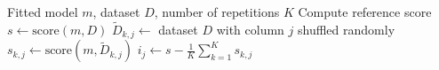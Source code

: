 \begin{algorithmic}
\Require Fitted model $m$, dataset $D$, number of repetitions $K$
\State Compute reference score $s \gets \text{score}(m, D)$
        \State $\tilde{D}_{k,j} \gets$ dataset $D$ with column $j$ shuffled randomly
        \State $s_{k,j} \gets \text{score}(m, \tilde{D}_{k,j})$
    \EndFor
    \State $i_j \gets s - \frac{1}{K} \sum_{k=1}^{K} s_{k,j}$
\EndFor
\end{algorithmic}